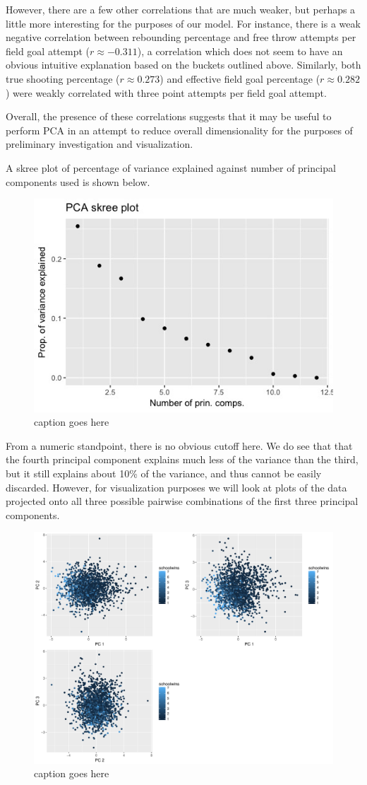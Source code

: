 \documentclass[10pt,a4paper, hidelinks]{article} %
\begin{document}
However, there are a few other correlations that are much weaker, but perhaps a little more interesting for the purposes of our model. For instance, there is a weak negative correlation between rebounding percentage and free throw attempts per field goal attempt ($r \approx -0.311$), a correlation which does not seem to have an obvious intuitive explanation based on the buckets outlined above. Similarly, both true shooting percentage ($r \approx 0.273$) and effective field goal percentage ($r \approx 0.282$) were weakly correlated with three point attempts per field goal attempt.

Overall, the presence of these correlations suggests that it may be useful to perform PCA in an attempt to reduce overall dimensionality for the purposes of preliminary investigation and visualization.

A skree plot of percentage of variance explained against number of principal components used is shown below. 

\begin{figure}[H]
	\centering
	\includegraphics[width=0.7\linewidth]{../fig/Skreeeeee}
	\caption{caption goes here}
	\label{fig:Skreeeeee}
\end{figure}

From a numeric standpoint, there is no obvious cutoff here. We do see that that the fourth principal component explains much less of the variance than the third, but it still explains about 10\% of the variance, and thus cannot be easily discarded. However, for visualization purposes we will look at plots of the data projected onto all three possible pairwise combinations of the first three principal components.

\begin{figure}[H]
	\centering
	\includegraphics[width=0.7\linewidth]{../fig/PrinComps}
	\caption{caption goes here}
	\label{fig:princomps}
\end{figure}
\end{document}
